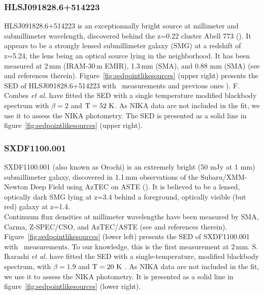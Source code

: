 
\subsubsection*{HLSJ091828.6+514223} 
HLSJ091828.6+514223 is an exceptionnally bright source at millimeter and submillimeter wavelength, discovered
behind the z=0.22 cluster Abell 773 (\cite{2012A&A...538L...4C}). It appears to
be a strongly lensed submillimeter galaxy (SMG) at a redshift of z=5.24, the
lens being an optical source lying in the neighborhood. It has been measured
at 2\,mm (IRAM-30\,m EMIR), 1.3\,mm (SMA), and 0.88 mm (SMA) (see
\cite{2012A&A...538L...4C} and references
therein). Figure~\ref{fig:sedpointlikesources} (upper right) presents the SED
of HLSJ091828.6+514223 with \NIKA\ measurements and previous ones \citep{2012A&A...538L...4C}).
F. Combes {\it et al.}  have fitted the SED with a
single temperature modified blackbody spectrum with $\beta=2$ and
$\rm T=52 \ {\rm K}$.
As NIKA data are not included in the fit, we use it to assess the NIKA photometry. The SED is presented as a solid line 
in figure~\ref{fig:sedpointlikesources} (upper right).



\subsubsection*{SXDF1100.001}
SXDF1100.001 (also known as Orochi) is an extremely bright (50 mJy at 1 mm)
submillimeter galaxy, discovered in 1.1\,mm observations of the
Subaru/XMM-Newton Deep Field using AzTEC on ASTE (\cite{Ikarashi:2010ar}).  It
is believed to be a lensed, optically dark SMG lying at z=3.4 behind a
foreground, optically visible (but red) galaxy at z=1.4.\\
Continuum flux densities at millimeter wavelengths have been measured by SMA,
Carma, Z-SPEC/CSO, and AzTEC/ASTE (see \cite{Ikarashi:2010ar} and references
therein). Figure~\ref{fig:sedpointlikesources} (lower left) presents the SED
of SXDF1100.001 with \NIKA\ measurements. To our knowledge, this is the first
measurement at    2\,mm.
S. Ikarashi {\it et al.}  have fitted the SED with a
single-temperature, modified blackbody spectrum, with $\beta=1.9$ and
$\rm T=20 \ {\rm K}$ \citep{Ikarashi:2010ar}.
As NIKA data are not included in the fit, we use it to assess the NIKA photometry. It is presented as a solid line 
in figure~\ref{fig:sedpointlikesources} (lower right).
 


